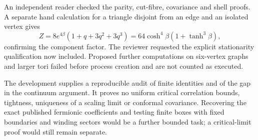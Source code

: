 An independent reader checked the parity, cut-fibre, covariance and
shell proofs. A separate hand calculation for a triangle disjoint from
an edge and an isolated vertex gives
\[
 Z=8e^{4\beta}(1+q+3q^2+3q^3)
  =64\cosh^4\beta(1+\tanh^3\beta),
\]
confirming the component factor. The reviewer requested the explicit
stationarity qualification now included. Proposed further computations
on six-vertex graphs and larger tori failed before process creation and
are not counted as executed.

The development supplies a reproducible audit of finite identities and
of the gap in the continuum argument. It proves no uniform critical
correlation bounds, tightness, uniqueness of a scaling limit or conformal
covariance. Recovering the exact published fermionic coefficients and
testing finite boxes with fixed boundaries and winding sectors would
be a further bounded task; a critical-limit proof would still remain
separate.
